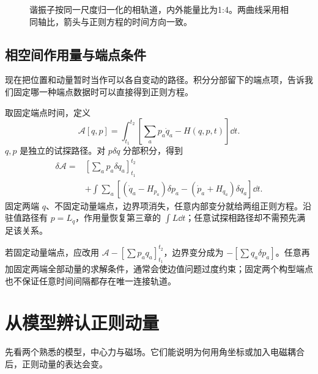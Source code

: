 \begin{figure}[htbp]
\centering
{}
\caption{谐振子按同一尺度归一化的相轨道，内外能量比为1:4。两曲线采用相同轴比，箭头与正则方程的时间方向一致。}
\label{fig:phase-oscillator}
\end{figure}

\subsection{相空间作用量与端点条件}
现在把位置和动量暂时当作可以各自变动的路径。积分分部留下的端点项，告诉我们固定哪一种端点数据时可以直接得到正则方程。

取固定端点时间，定义
\begin{equation}
\mathcal A[q,p]=\int_{t_1}^{t_2}\left[\sum_ap_a\dot q_a-H(q,p,t)\right]\dd t.
\label{eq:ham-phase-action}
\end{equation}
$q,p$ 是独立的试探路径。对 $p\delta\dot q$ 分部积分，得到
\begin{align*}
\delta\mathcal A={}&\left[\sum_ap_a\delta q_a\right]_{t_1}^{t_2}\\
&+\int\sum_a[(\dot q_a-H_{p_a})\delta p_a
-(\dot p_a+H_{q_a})\delta q_a]\dd t.
\end{align*}
固定两端 $q$、不固定动量端点，边界项消失，任意内部变分就给两组正则方程。沿驻值路径有 $p=L_{\dot q}$，作用量恢复第三章的 $\int L\dd t$；任意试探相路径却不需预先满足该关系。

若固定动量端点，应改用 $\mathcal A-[\sum p_aq_a]_{t_1}^{t_2}$，边界变分成为 $-[\sum q_a\delta p_a]$。任意再加固定两端全部动量的求解条件，通常会使边值问题过度约束；固定两个构型端点也不保证任意时间间隔都存在唯一连接轨道。


\section{从模型辨认正则动量}
先看两个熟悉的模型，中心力与磁场。它们能说明为何用角坐标或加入电磁耦合后，正则动量的表达会变。

